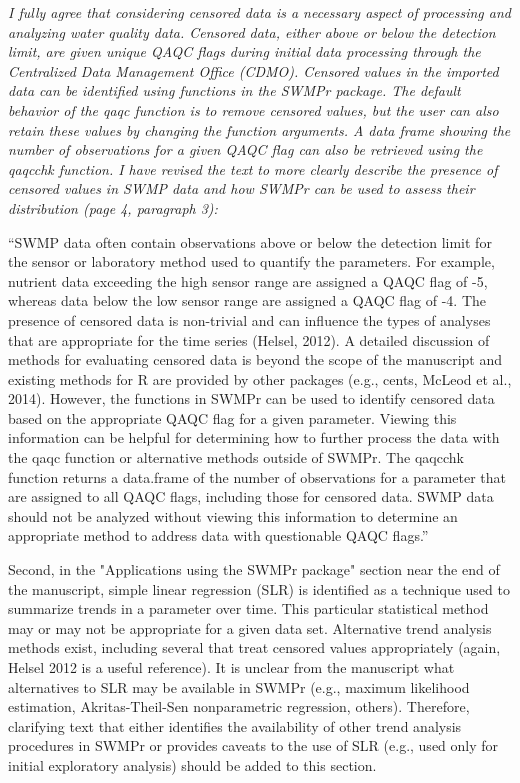 \documentclass[letterpaper,12pt]{article}\usepackage[]{graphicx}\usepackage[]{color}
\begin{document}
{\it I fully agree that considering censored data is a necessary aspect of processing and analyzing water quality data.  Censored data, either above or below the detection limit, are given unique QAQC flags during initial data processing through the Centralized Data Management Office (CDMO).  Censored values in the imported data can be identified using functions in the SWMPr package.  The default behavior of the qaqc function is to remove censored values, but the user can also retain these values by changing the function arguments.  A data frame showing the number of observations for a given QAQC flag can also be retrieved using the qaqcchk function.  I have revised the text to more clearly describe the presence of censored values in SWMP data and how SWMPr can be used to assess their distribution (page 4, paragraph 3): 

``SWMP data often contain observations above or below the detection limit for the sensor or laboratory method used to quantify the parameters.  For example, nutrient data exceeding the high sensor range are assigned a QAQC flag of -5, whereas data below the low sensor range are assigned a QAQC flag of -4.  The presence of censored data is non-trivial and can influence the types of analyses that are appropriate for the time series (Helsel, 2012).  A detailed discussion of methods for evaluating censored data is beyond the scope of the manuscript and existing methods for R are provided by other packages (e.g., cents, McLeod et al., 2014).  However, the functions in SWMPr can be used to identify censored data based on the appropriate QAQC flag for a given parameter.  Viewing this information can be helpful for determining how to further process the data with the qaqc function or alternative methods outside of SWMPr.  The qaqcchk function returns a data.frame of the number of observations for a parameter that are assigned to all QAQC flags, including those for censored data.  SWMP data should not be analyzed without viewing this information to determine an appropriate method to address data with questionable QAQC flags.''
}

Second, in the "Applications using the SWMPr package" section near the end of the manuscript, simple linear regression (SLR) is identified as a technique used to summarize trends in a parameter over time. This particular statistical method may or may not be appropriate for a given data set. Alternative trend analysis methods exist, including several that treat censored values appropriately (again, Helsel 2012 is a useful reference). It is unclear from the manuscript what alternatives to SLR may be available in SWMPr (e.g., maximum likelihood estimation, Akritas-Theil-Sen nonparametric regression, others). Therefore, clarifying text that either identifies the availability of other trend analysis procedures in SWMPr or provides caveats to the use of SLR (e.g., used only for initial exploratory analysis) should be added to this section.
\end{document}
